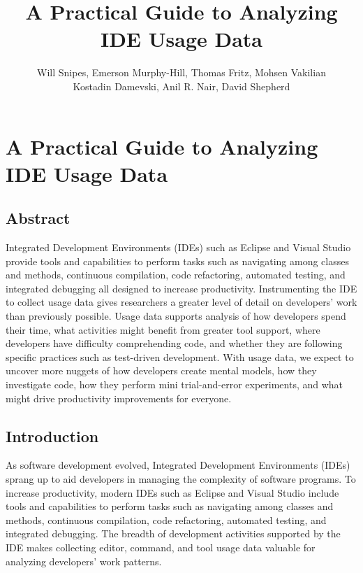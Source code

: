 \documentclass{book}
\begin{document}

\title{A Practical Guide to Analyzing IDE Usage Data\vspace{-0ex}}

\chapter{A Practical Guide to Analyzing IDE Usage Data\vspace{-0ex}}
\author{
Will Snipes, Emerson Murphy-Hill,
Thomas Fritz, Mohsen Vakilian \\
Kostadin Damevski,
Anil R. Nair, David Shepherd
}
\maketitle
\thispagestyle{empty}
\pagestyle{empty}

\begin{center}
\section*{Abstract}
\end{center}
Integrated Development Environments (IDEs) such as Eclipse and Visual Studio provide tools and capabilities to perform tasks such as navigating among classes and methods, continuous compilation, code refactoring, automated testing, and integrated debugging all designed to increase productivity.  Instrumenting the IDE to collect usage data gives researchers a greater level of detail on developers' work than previously possible.  Usage data supports analysis of how developers spend their time, what activities might benefit from greater tool support, where developers have difficulty comprehending code, and whether they are following specific practices such as test-driven development.  With usage data, we expect to uncover more nuggets of how developers create mental models, how they investigate code, how they perform mini trial-and-error experiments, and what might drive productivity improvements for everyone.

\section{Introduction}
As software development evolved, Integrated Development Environments (IDEs) sprang up to aid  developers in managing the complexity of software programs.  To increase productivity, modern IDEs such as Eclipse and Visual Studio include tools and capabilities to perform tasks such as navigating among classes and methods, continuous compilation, code refactoring, automated testing, and integrated debugging.  The breadth of development activities supported by the IDE makes collecting editor, command, and tool usage data valuable for analyzing developers' work patterns.  
\end{document}
